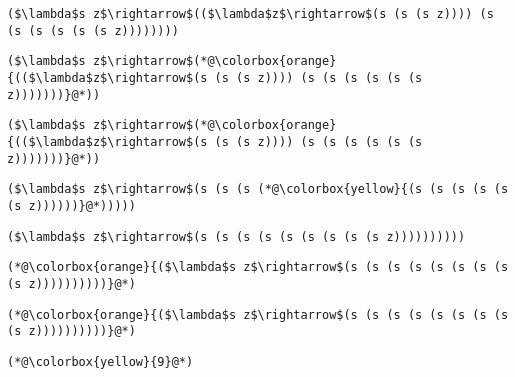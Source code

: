 \documentclass{beamer}
\begin{document}
\begin{frame}[fragile]{\CurrentSection}
\lstset{basicstyle=\ttfamily\small}\lstset{numbers=none}\lstset{language=ML}\begin{lstlisting}
($\lambda$s z$\rightarrow$(($\lambda$z$\rightarrow$(s (s (s z)))) (s (s (s (s (s (s z))))))))
\end{lstlisting}
\pause\lstset{language=ML}\begin{lstlisting}
($\lambda$s z$\rightarrow$(*@\colorbox{orange}{(($\lambda$z$\rightarrow$(s (s (s z)))) (s (s (s (s (s (s z)))))))}@*))
\end{lstlisting}

\end{frame}

\begin{frame}[fragile]{\CurrentSection}
\lstset{basicstyle=\ttfamily\small}\lstset{numbers=none}\lstset{language=ML}\begin{lstlisting}
($\lambda$s z$\rightarrow$(*@\colorbox{orange}{(($\lambda$z$\rightarrow$(s (s (s z)))) (s (s (s (s (s (s z)))))))}@*))
\end{lstlisting}
\pause\lstset{language=ML}\begin{lstlisting}
($\lambda$s z$\rightarrow$(s (s (s (*@\colorbox{yellow}{(s (s (s (s (s (s z))))))}@*)))))
\end{lstlisting}

\end{frame}

\begin{frame}[fragile]{\CurrentSection}
\lstset{basicstyle=\ttfamily\small}\lstset{numbers=none}\lstset{language=ML}\begin{lstlisting}
($\lambda$s z$\rightarrow$(s (s (s (s (s (s (s (s (s z))))))))))
\end{lstlisting}
\pause\lstset{language=ML}\begin{lstlisting}
(*@\colorbox{orange}{($\lambda$s z$\rightarrow$(s (s (s (s (s (s (s (s (s z))))))))))}@*)
\end{lstlisting}

\end{frame}

\begin{frame}[fragile]{\CurrentSection}
\lstset{basicstyle=\ttfamily\small}\lstset{numbers=none}\lstset{language=ML}\begin{lstlisting}
(*@\colorbox{orange}{($\lambda$s z$\rightarrow$(s (s (s (s (s (s (s (s (s z))))))))))}@*)
\end{lstlisting}
\pause\lstset{language=ML}\begin{lstlisting}
(*@\colorbox{yellow}{9}@*)
\end{lstlisting}

\end{frame}
\end{document}
